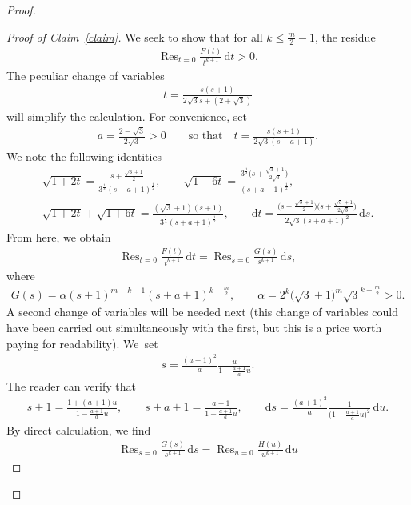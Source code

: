 \documentclass[11pt]{article}
\numberwithin{equation}{section}
\numberwithin{equation}{section}
\begin{document}
\begin{proof}
\begin{proof}[Proof of Claim~\ref{claim}]
We seek to show that for all $k\leq \frac{m}{2}-1$, the residue
\begin{gather*}
\operatorname{Res}_{t=0} \frac{F(t)}{t^{k+1}} \,{\mathrm dt}>0.
\end{gather*}
The peculiar change of variables
\begin{gather*}
t=\frac{s(s+1)}{2\sqrt{3}s+(2+\sqrt{3})}
\end{gather*}
will simplify the calculation.
For convenience, set
\begin{gather*}
a=\frac{2-\sqrt{3}}{2\sqrt{3}}>0\qquad\text{so that}\quad t=\frac{s(s+1)}{2\sqrt{3}(s+a+1)}.
\end{gather*}
We note the following identities
\begin{gather*}
\sqrt{1+2t}=\frac{s+\frac{\sqrt{3}+1}{2}}{3^{\frac{1}{4}} (s+a+1)^{\frac{1}{2}}}, \qquad \sqrt{1+6t}=\frac{3^{\frac{1}{4}}\big(s+\frac{\sqrt{3}+1}{2\sqrt{3}}\big)}{(s+a+1)^{\frac{1}{2}}},
\\
\sqrt{1+2t}+\sqrt{1+6t}=\frac{(\sqrt{3}+1)(s+1)}{3^{\frac{1}{4}}(s+a+1)^{\frac{1}{2}}},\qquad
{\mathrm dt}=\frac{\big(s+\frac{\sqrt{3}+1}{2}\big)\big(s+\frac{\sqrt{3}+1}{2\sqrt{3}}\big)}{2\sqrt{3} (s+a+1)^2}\,{\mathrm ds}.
\end{gather*}
From here, we obtain
\begin{gather*}
\operatorname{Res}_{t=0} \frac{F(t)}{t^{k+1}} \,{\mathrm dt}=\operatorname{Res}_{s=0} \frac{G(s)}{s^{k+1}} \,{\mathrm ds},
\end{gather*}
where
\begin{gather*}
G(s)=\alpha (s+1)^{m-k-1} (s+a+1)^{k-\frac{m}{2}}, \qquad
\alpha=2^k \big(\sqrt{3}+1\big)^{m} \sqrt{3}^{k-\frac{m}{2}}>0.
\end{gather*}
A second change of variables will be needed next (this change of variables could have been carried out simultaneously with the first, but this is a price worth paying for readability). We~set
\begin{gather*}
s=\frac{(a+1)^2}{a} \frac{u}{1-\frac{a+1}{a}u}.
\end{gather*}
The reader can verify that
\begin{gather*}
s+1=\frac{1+(a+1)u}{1-\frac{a+1}{a}u}, \qquad s+a+1=\frac{a+1}{1-\frac{a+1}{a}u}, \qquad
{\mathrm ds}=\frac{(a+1)^2}{a} \frac{1}{\big(1-\frac{a+1}{a}u\big)^2}\,{\mathrm du}.
\end{gather*}
By direct calculation, we find
\begin{gather*}
\operatorname{Res}_{s=0} \frac{G(s)}{s^{k+1}}\,{\mathrm ds}=\operatorname{Res}_{u=0} \frac{H(u)}{u^{k+1}}\,{\mathrm du}

\end{gather*}
\end{proof}
\end{proof}
\end{document}
